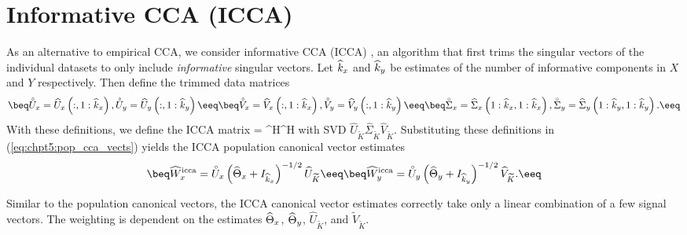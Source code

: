 \section{Informative CCA (ICCA)}\label{sec:chpt5:icca}

As an alternative to empirical CCA, we consider informative CCA (ICCA)
\cite{nadakuditi2011fundamental}, an algorithm that first trims the singular vectors of
the individual datasets to only include \textit{informative} singular vectors. Let
$\widehat{k}_x$ and $\widehat{k}_y$ be estimates of the number of informative components in $X$ and $Y$
respectively. Then define the trimmed data matrices
\begin{subequations}\label{eq:chpt5:trimmed_matrices}
\beq
 \Uxcir = \Uxhat\left(:,1:\kxhat\right),  \Uycir = \Uyhat\left(:,1:\kyhat\right)
\eeq
\beq
 \Vxcir = \Vxhat\left(:,1:\kxhat\right),
 \Vycir = \Vyhat\left(:,1:\kyhat\right)
\eeq
\beq
 \Sigxcir = \Sigxhat\left(1:\kxhat,1:\kxhat\right),
 \Sigycir = \Sigyhat\left(1:\kyhat,1:\kyhat\right).
\eeq
\end{subequations}
With these definitions, we define the ICCA matrix \beq\label{eq:chpt5:cicca}
\Ciccahat =
\Uxcir\Vxcir^H\Vycir\Uycir^H
\eeq
with SVD 
$\widehat{U}_{\widetilde{K}}\widehat{\Sigma}_{\widetilde{K}}\widehat{V}_{\widetilde{K}}$. 
Substituting these definitions in (\ref{eq:chpt5:pop_cca_vects}) yields the
ICCA population canonical vector estimates
\begin{subequations}\label{eq:chpt5:plugin_cca_vects}
\beq
\widehat{W}_x^{\text{icca}} = \Uxcir\left(\Txhat + I_{\kxhat}\right)^{-1/2}\Uktilhat
\eeq
\beq
\widehat{W}_y^{\text{icca}} = \Uycir\left(\Tyhat + I_{\kyhat}\right)^{-1/2}\Vktilhat.
\eeq
\end{subequations}

Similar to the population canonical vectors, the ICCA canonical
vector estimates correctly take only a linear combination of a few signal vectors. The
weighting is dependent on the estimates $\widehat{\Theta}_x$, $\widehat{\Theta}_y$, $\widehat{U}_{\widetilde{K}}$,
and $\widetilde{V}_{\widetilde{K}}$. 

